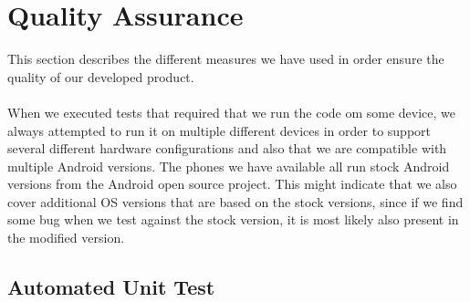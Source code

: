
\chapter{Quality Assurance}
\label{cha:quality_assurance}

This section describes the different measures we have used in order ensure the quality of our developed product. 
\\\\
When we executed tests that required that we run the code om some device, we always attempted to run it on multiple different devices in order to support several different hardware configurations and also that we are compatible with multiple Android versions. The phones we have available all run stock Android versions from the Android open source project. This might indicate that we also cover additional OS versions that are based on the stock versions, since if we find some bug when we test against the stock version, it is most likely also present in the modified version. 



\section{Automated Unit Test}
\label{sec:automated_unit_test}


